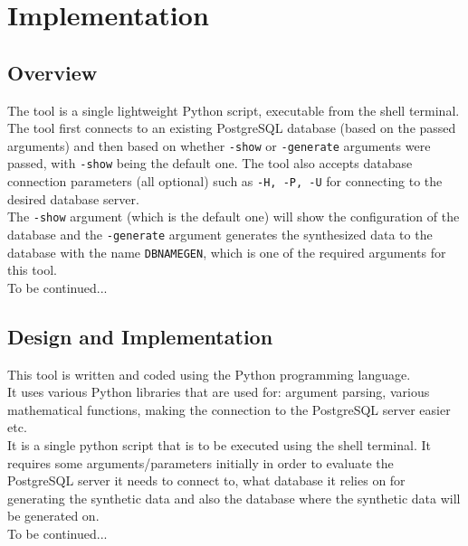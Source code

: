 \chapter{Implementation}
\label{ch:implementation}
\section{Overview}
The tool is a single lightweight Python script, executable from the shell terminal. The tool first connects to an existing PostgreSQL database (based on the passed arguments) and then based on whether \texttt{-show} or \texttt{-generate} arguments were passed, with \texttt{-show} being the default one. The tool also accepts database connection parameters (all optional) such as \texttt{-H, -P, -U} for connecting to the desired database server.\\
The \texttt{-show} argument (which is the default one) will show the configuration of the database and the \texttt{-generate} argument generates the synthesized data to the database with the name \texttt{DBNAMEGEN}, which is one of the required arguments for this tool.\\
To be continued...
\section{Design and Implementation}
This tool is written and coded using the Python programming language.\\
It uses various Python libraries that are used for: argument parsing, various mathematical functions, making the connection to the PostgreSQL server easier etc.\\
It is a single python script that is to be executed using the shell terminal. It requires some arguments/parameters initially in order to evaluate the PostgreSQL server it needs to connect to, what database it relies on for generating the synthetic data and also the database where the synthetic data will be generated on.\\
To be continued...
